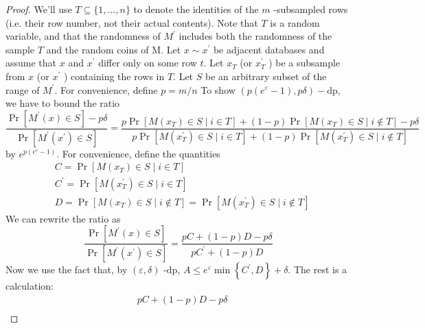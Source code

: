 \documentclass{ctexart}
\begin{document}
\begin{proof}
    We'll use $T \subseteq\{1, \ldots, n\}$ to denote the identities of the $m$ -subsampled rows (i.e. their row number, not their actual contents). Note that $T$ is a random variable, and that the randomness of $M^{\prime}$ includes both the randomness of the sample $T$ and the random coins of
    M. Let $x \sim x^{\prime}$ be adjacent databases and assume that $x$ and $x^{\prime}$ differ only on some row $t$. Let $x_{T}$ (or $x_{T}^{\prime}$ ) be a subsample from $x$ (or $x^{\prime}$ ) containing the rows in $T$. Let $S$ be an arbitrary subset of the range of $M^{\prime} .$ For convenience, define $p=m / n$ To show $\left(p\left(e^{\varepsilon}-1\right), p \delta\right)-\mathrm{dp}$, we have to bound the ratio
    $$
        \frac{\operatorname{Pr}\left[M^{\prime}(x) \in S\right]-p \delta}{\operatorname{Pr}\left[M^{\prime}\left(x^{\prime}\right) \in S\right]}=\frac{p \operatorname{Pr}\left[M\left(x_{T}\right) \in S \mid i \in T\right]+(1-p) \operatorname{Pr}\left[M\left(x_{T}\right) \in S \mid i \notin T\right]-p \delta}{p \operatorname{Pr}\left[M\left(x_{T}^{\prime}\right) \in S \mid i \in T\right]+(1-p) \operatorname{Pr}\left[M\left(x_{T}^{\prime}\right) \in S \mid i \notin T\right]}
    $$
    by $e^{p\left(e^{\varepsilon}-1\right)}$. For convenience, define the quantities
    $$
        \begin{aligned}
             & C=\operatorname{Pr}\left[M\left(x_{T}\right) \in S \mid i \in T\right]                                                                                     \\
             & C^{\prime}=\operatorname{Pr}\left[M\left(x_{T}^{\prime}\right) \in S \mid i \in T\right]                                                                   \\
             & D=\operatorname{Pr}\left[M\left(x_{T}\right) \in S \mid i \notin T\right]=\operatorname{Pr}\left[M\left(x_{T}^{\prime}\right) \in S \mid i \notin T\right]
        \end{aligned}
    $$
    We can rewrite the ratio as
    $$
        \frac{\operatorname{Pr}\left[M^{\prime}(x) \in S\right]}{\operatorname{Pr}\left[M^{\prime}\left(x^{\prime}\right) \in S\right]}=\frac{p C+(1-p) D-p \delta}{p C^{\prime}+(1-p) D}
    $$
    Now we use the fact that, by $(\varepsilon, \delta)$ -dp, $A \leq e^{\varepsilon} \min \left\{C^{\prime}, D\right\}+\delta$. The rest is a calculation:
    $$
        \begin{aligned}
                 & p C+(1-p) D-p \delta                                                                                                                                    \\

\end{aligned}$$
\end{proof}
\end{document}
